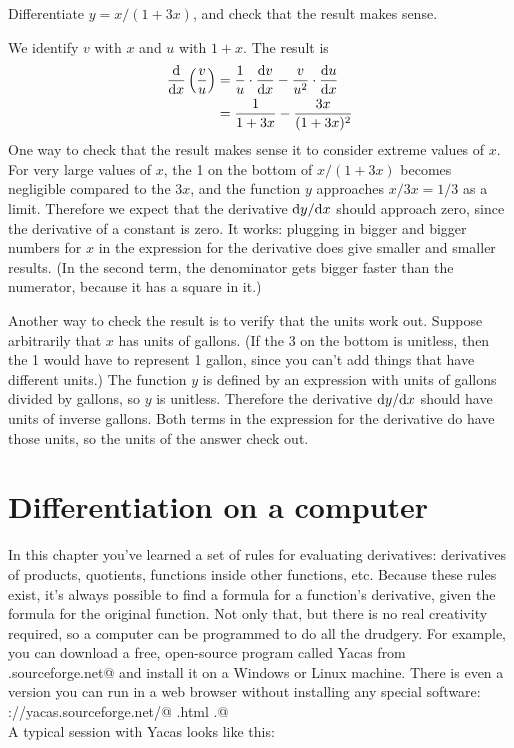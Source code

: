 \begin{eg}
\egquestion Differentiate $y=x/(1+3x)$, and check that the result makes sense.

\eganswer We identify $v$ with $x$ and $u$ with $1+x$. The result is
\begin{align*}
  \frac{\textup{d}}{\textup{d} x} \left(\frac{v}{u}\right) &= \frac{1}{u}\cdot\frac{\textup{d} v}{\textup{d} x} - \frac{v}{u^2} \cdot \frac{\textup{d} u}{\textup{d} x} \\
            &= \frac{1}{1+3x} - \frac{3x}{(1+3x)^2}
\end{align*}
One way to check that the result makes sense it to consider extreme values of $x$. For very large values of $x$, the
1 on the bottom of $x/(1+3x)$ becomes negligible compared to the $3x$, and the function $y$ approaches $x/3x=1/3$ as a limit.
Therefore we expect that the derivative $\textup{d} y/\textup{d} x$ should approach zero, since the derivative of a constant is
zero. It works: plugging in bigger and bigger numbers for $x$ in the expression for the derivative does give
smaller and smaller results. (In the second term, the denominator gets bigger faster than the numerator, because
it has a square in it.)

Another way to check the result is to verify that the units work out. Suppose arbitrarily that $x$ has units of gallons.
(If the 3 on the bottom is unitless, then the 1 would have to represent 1 gallon, since you can't add things that have
different units.) The function $y$ is defined by an expression with units of gallons divided by gallons, so $y$ is
unitless. Therefore the derivative $\textup{d} y/\textup{d} x$ should have units of inverse gallons. Both terms in the
expression for the derivative do have those units, so the units of the answer check out.
\end{eg}

\section{Differentiation on a computer}
In this chapter you've learned a set of rules for evaluating derivatives: derivatives of products,
quotients, functions inside other functions, etc. Because these rules exist, it's always
possible to find a formula for a function's derivative, given the formula for the original
function. Not only that, but there is no real creativity required, so a computer can be
programmed to do all the drudgery. For example, you can download a free, open-source program
called Yacas from \verb@yacas.sourceforge.net@
%
%
and install it on a Windows or Linux machine. There is even a version you can run in a web
browser without installing any special software:
\verb@http://yacas.sourceforge.net/@
\verb@yacasconsole.html  .@\\
 A typical session with Yacas looks like this:

